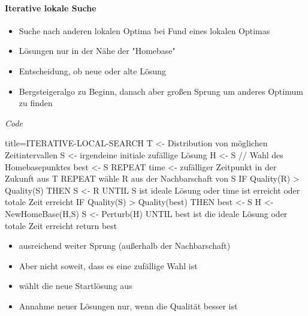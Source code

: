 \documentclass[
    ngerman,
    color=3b,
    dark_mode,
    load_common, %
    summary,
    boxarc,
]{tuda_summary}
\begin{document}
\clearpage
\paragraph{Iterative lokale Suche}\mbox{}
\begin{idea}\mbox{}
    \begin{itemize}
        \item Suche nach anderen lokalen Optima bei Fund eines lokalen Optimas
        \item Lösungen nur in der Nähe der \string"Homebase\string"
        \item Entscheidung, ob neue oder alte Lösung
        \item Bergsteigeralgo zu Beginn, danach aber gro\ss{}en Sprung um anderes Optimum zu finden
    \end{itemize}
\end{idea}

\textit{Code}
\begin{codeBlock}[autogobble,fontsize=\small]{title={ITERATIVE-LOCAL-SEARCH}}
    T <- Distribution von möglichen Zeitintervallen
    S <- irgendeine initiale zufällige Lösung
    H <- S      // Wahl des Homebasepunktes
    best <- S
    REPEAT
        time <- zufälliger Zeitpunkt in der Zukunft aus T
        REPEAT
            wähle R aus der Nachbarschaft von S
            IF Quality(R) > Quality(S) THEN
                S <- R
        UNTIL S ist ideale Lösung oder time ist erreicht oder totale Zeit erreicht
        IF Quality(S) > Quality(best) THEN
            best <- S
        H <- NewHomeBase(H,S)
        S <- Perturb(H)
    UNTIL best ist die ideale Lösung oder totale Zeit erreicht
    return best
\end{codeBlock}
\begin{description}[leftmargin=3cm,itemsep=1em]
    \item[Perturb] \begin{itemize}
              \item ausreichend weiter Sprung (au\ss{}erhalb der Nachbarschaft)
              \item Aber nicht soweit, dass es eine zufällige Wahl ist
          \end{itemize}
    \item[NewHomeBase] \begin{itemize}
              \item wählt die neue Startlösung aus
              \item Annahme neuer Lösungen nur, wenn die Qualität besser ist
          \end{itemize}
\end{description}
\end{document}
